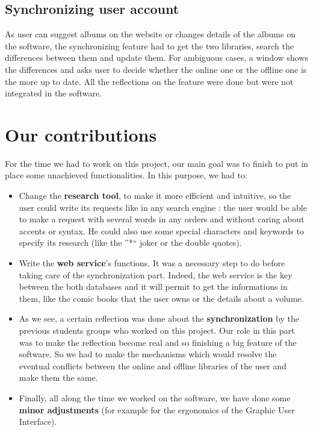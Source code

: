 \documentclass[11pt]{report} %
\newcommand{\txtimp}[1]{\textbf{#1}}
\begin{document}
\subsection{Synchronizing user account}
As user can suggest albums on the website or changes details of the albums on the software, the synchronizing feature had to get the two libraries, search the differences between them and update them. For ambiguous cases, a window shows the differences and asks user to decide whether the online one or the offline one is the more up to date. All the reflections on the feature were done but were not integrated in the software.

\section{Our contributions}
For the time we had to work on this project, our main goal was to finish to put in place some unachieved functionalities. In this purpose, we had to:
\begin{itemize}
\item Change the \txtimp{research tool}, to make it more efficient and intuitive, so the user could write its requests like in any search engine : the user would be able to make a request with several words in any orders and without caring about accents or syntax. He could also use some special characters and keywords to specify its research (like the ''*`` joker or the double quotes).
\item Write the \txtimp{web service}'s functions. It was a necessary step to do before taking care of the synchronization part. Indeed, the web service is the key between the both databases and it will permit to get the informations in them, like the comic books that the user owns or the details about a volume.
\item As we see, a certain reflection was done about the \txtimp{synchronization} by the previous students groups who worked on this project. Our role in this part was to make the reflection become real and so finishing a big feature of the software. So we had to make the mechanisms which would resolve the eventual conflicts between the online and offline libraries of the user and make them the same.
\item Finally, all along the time we worked on the software, we have done some \txtimp{minor adjustments} (for example for the ergonomics of the Graphic User Interface).

\end{itemize}
\end{document}
